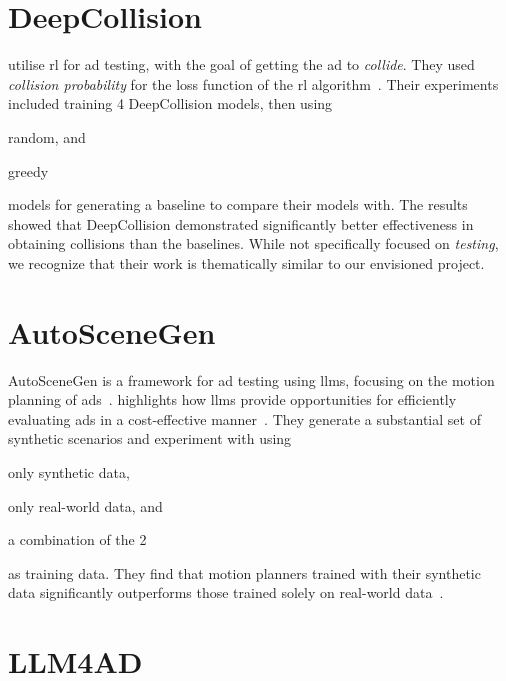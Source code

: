 \section{DeepCollision}

\citeauthor{deepCollision} utilise \acrfull{rl} for \acrshort{ad} testing, with the goal of getting
the \acrshort{ad} to \textit{collide}. They used \textit{collision probability} for the loss
function of the \acrlong{rl} algorithm~\cite[384]{deepCollision}. Their experiments included
training 4 DeepCollision models, then using \begin{inparaenum}
    \item random, and
    \item greedy
\end{inparaenum} models for generating a baseline to compare their models with. The results showed
that DeepCollision demonstrated significantly better effectiveness in obtaining collisions than the
baselines. While not specifically focused on \textit{testing}, we recognize that their work is thematically
similar to our envisioned project.

\section{AutoSceneGen}

AutoSceneGen is a framework for \acrshort{ad} testing using \acrshort{llms},
focusing on the motion planning of \acrlong{ads}~\cite[14539]{autoSceneGen}.
\citeauthor{autoSceneGen} highlights how \acrshort{llms} provide opportunities
for efficiently evaluating \acrshort{ads} in a cost-effective
manner~\cite[14539-14540]{autoSceneGen}. They generate a substantial set of synthetic scenarios and
experiment with using \begin{inparaenum}
    \item only synthetic data,
    \item only real-world data, and
    \item a combination of the \num{2} \end{inparaenum} as training data. They find that motion
planners trained with their synthetic data significantly outperforms those trained solely on
real-world data~\cite[14539]{autoSceneGen}.

\section{LLM4AD}

